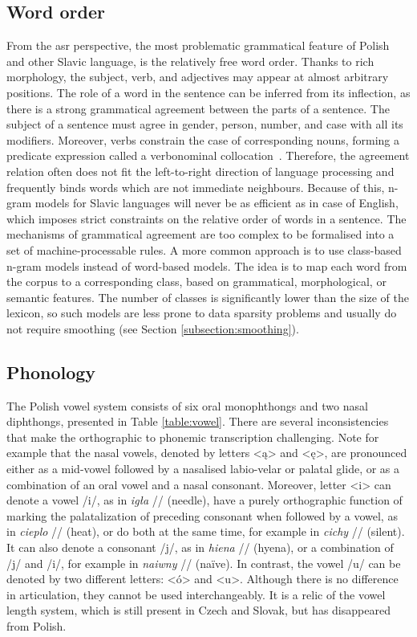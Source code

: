 \subsection{Word order}
From the \gls{asr} perspective, the most problematic grammatical feature of Polish and other Slavic language, is the relatively free word order. Thanks to rich morphology, the subject, verb, and adjectives may appear at almost arbitrary positions. The role of a word in the sentence can be inferred from its inflection, as there is a strong grammatical agreement between the parts of a sentence. The subject of a sentence must agree in gender, person, number, and case with all its modifiers. Moreover, verbs constrain the case of corresponding nouns, forming a predicate expression called a verbonominal collocation~\cite{vetulani2007towards}. Therefore, the agreement relation often does not fit the left-to-right direction of language processing and frequently binds words which are not immediate neighbours. Because of this, n-gram models for Slavic languages will never be as efficient as in case of English, which imposes strict constraints on the relative order of words in a sentence. The mechanisms of grammatical agreement are too complex to be formalised into a set of machine-processable rules. A more common approach is to use class-based n-gram models instead of word-based models. The idea is to map each word from the corpus to a corresponding class, based on grammatical, morphological, or semantic features. The number of classes is significantly lower than the size of the lexicon, so such models are less prone to data sparsity problems and usually do not require smoothing (see Section \ref{subsection:smoothing}).

\subsection{Phonology}
The Polish vowel system consists of six oral monophthongs and two nasal diphthongs, presented in Table \ref{table:vowel}. There are several inconsistencies that make the orthographic to phonemic transcription challenging. Note for example that the nasal vowels, denoted by letters <ą> and <ę>, are pronounced either as a mid-vowel followed by a nasalised labio-velar or palatal glide, or as a combination of an oral vowel and a nasal consonant. Moreover, letter <i> can denote a vowel /i/, as in \textit{igła} // (needle), have a purely orthographic function of marking the palatalization of preceding consonant when followed by a vowel, as in \textit{cieplo} // (heat), or do both at the same time, for example in \textit{cichy} // (silent). It can also denote a consonant /j/, as in \textit{hiena} // (hyena), or a combination of /j/ and /i/, for example in \textit{naiwny} // (naïve). In contrast, the vowel /u/ can be denoted by two different letters: <ó> and <u>. Although there is no difference in articulation, they cannot be used interchangeably. It is a relic of the vowel length system, which is still present in Czech and Slovak, but has disappeared from Polish.


